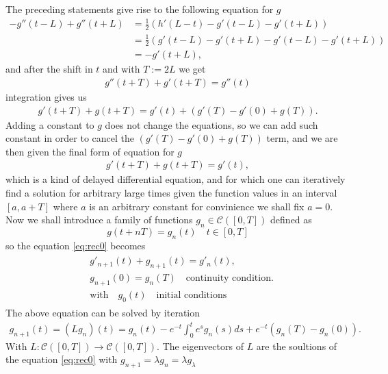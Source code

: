 \documentclass[
a4paper,%
10pt,%
titlepage,%
twoside%
]{article}
\begin{document}
The preceding statements give rise to the following equation for $g$
\begin{equation}
  \begin{split}
    -g''(t-L)+g''(t+L)&=\frac{1}{2}(h'(L-t)-g'(t-L)-g'(t+L))\\
    &=\frac{1}{2}(g'(t-L)-g'(t+L)-g'(t-L)-g'(t+L))\\
    &=-g'(t+L),
  \end{split}
\end{equation}
and after the shift in $t$ and with $T:=2L$ we get
\begin{gather}
  g''(t+T)+g'(t+T)=g''(t)
\end{gather}
integration gives us
\begin{gather}
  g'(t+T)+g(t+T)=g'(t)+(g'(T)-g'(0)+g(T)).
\end{gather}
Adding a constant to $g$ does not change the equations, so we can
add such constant in order to cancel the $(g'(T)-g'(0)+g(T))$ term,
and we are then given the final form of equation for $g$
\begin{gather}
  \label{eq:dde}
  g'(t+T)+g(t+T)=g'(t),
\end{gather}
which is a kind of delayed differential equation, and for which one
can iteratively find a solution for arbitrary large times given the
function values in an interval $[a,a+T]$ where $a$ is an arbitrary
constant for convinience we shall fix $a=0$. Now we shall introduce a
family of functions $g_n\in\mathcal{C}([0,T])$ defined as
\begin{equation}
    g(t+nT)=g_n(t)\quad t\in[0,T]
\end{equation}
so the equation \eqref{eq:rec0} becomes
\begin{gather}
  \label{eq:rec0}
  \begin{split}
    &g'_{n+1}(t)+g_{n+1}(t)=g'_n(t),\\
    &g_{n+1}(0)=g_n(T)\quad\text{continuity condition}.\\
    &\text{with}\quad g_0(t)\quad\text{initial conditions}
  \end{split}
\end{gather}
The above equation can be solved by iteration
\begin{gather}\label{eq:defL}
  g_{n+1}(t)=(Lg_n)(t)=g_n(t)-e^{-t}\int_0^t e^s g_n(s)ds+e^{-t}(g_n(T)-g_n(0)).
\end{gather}
With $L:\mathcal{C}([0,T])\rightarrow \mathcal{C}([0,T])$. The
eigenvectors of $L$ are the soultions of the equation \eqref{eq:rec0}
with $g_{n+1}=\lambda g_n=\lambda g_\lambda$
\end{document}
